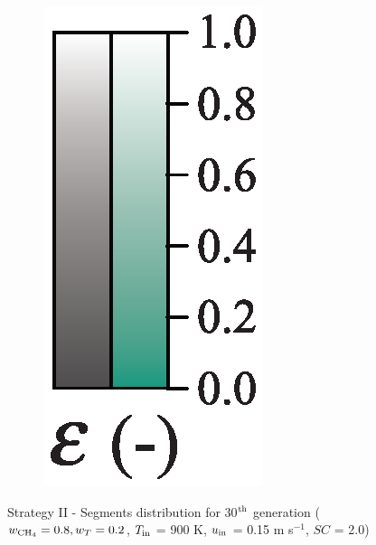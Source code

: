 \documentclass[preprint,12pt]{elsarticle}
\begin{document}
\begin{figure}[h!]
\begin{subfigure}[b]{0.1\textwidth}
     	\includegraphics[width=\textwidth]{segments_porosity.eps}
     \end{subfigure}
\caption{\label{fig:30L6040G1-TField} Strategy II - Segments distribution for 30$^{\rm{th}}$ generation ($w_{\rm{CH_4}} = 0.8, w_T = 0.2$, $T_{\rm{in}}$ = 900 K, $u_{\rm{in}}$ = 0.15 m s$^{-1}$, $SC$ = 2.0)}
\end{figure}
\end{document}
